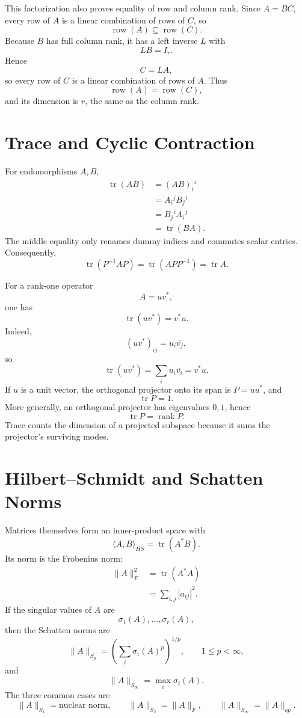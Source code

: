 This factorization also proves equality of row and column rank.  Since \(A=BC\), every row of \(A\) is a linear combination of rows of \(C\), so
\[
  \operatorname{row}(A)
  \subseteq\operatorname{row}(C).
\]
Because \(B\) has full column rank, it has a left inverse \(L\) with
\[
  LB=I_r.
\]
Hence
\[
  C=LA,
\]
so every row of \(C\) is a linear combination of rows of \(A\).  Thus
\[
  \operatorname{row}(A)
  =\operatorname{row}(C),
\]
and its dimension is \(r\), the same as the column rank.

\section{Trace and Cyclic Contraction}

For endomorphisms \(A,B\),
\[
\begin{aligned}
  \operatorname{tr}(AB)
  &=(AB)_i{}^i\\
  &=A_i{}^jB_j{}^i\\
  &=B_j{}^iA_i{}^j\\
  &=\operatorname{tr}(BA).
\end{aligned}
\]
The middle equality only renames dummy indices and commutes scalar entries.  Consequently,
\[
  \operatorname{tr}(P^{-1}AP)
  =\operatorname{tr}(APP^{-1})
  =\operatorname{tr}A.
\]

For a rank-one operator
\[
  A=uv^*,
\]
one has
\[
  \boxed{
  \operatorname{tr}(uv^*)=v^*u.}
\]
Indeed,
\[
  (uv^*)_{ij}=u_i\overline{v_j},
\]
so
\[
  \operatorname{tr}(uv^*)
  =\sum_i u_i\overline{v_i}
  =v^*u.
\]
If \(u\) is a unit vector, the orthogonal projector onto its span is \(P=uu^*\), and
\[
  \operatorname{tr}P=1.
\]
More generally, an orthogonal projector has eigenvalues \(0,1\), hence
\[
  \operatorname{tr}P=\operatorname{rank}P.
\]
Trace counts the dimension of a projected subspace because it sums the projector's surviving modes.

\section{Hilbert--Schmidt and Schatten Norms}

Matrices themselves form an inner-product space with
\[
  \langle A,B\rangle_{HS}
  =\operatorname{tr}(A^*B).
\]
Its norm is the Frobenius norm:
\[
\begin{aligned}
  \|A\|_F^2
  &=\operatorname{tr}(A^*A)\\
  &=\sum_{i,j}|a_{ij}|^2.
\end{aligned}
\]
If the singular values of \(A\) are
\[
  \sigma_1(A),\ldots,\sigma_r(A),
\]
then the Schatten norms are
\[
  \|A\|_{S_p}
  =
  \left(
  \sum_i\sigma_i(A)^p
  \right)^{1/p},
  \qquad1\le p<\infty,
\]
and
\[
  \|A\|_{S_\infty}=\max_i\sigma_i(A).
\]
The three common cases are
\[
  \|A\|_{S_1}=\text{nuclear norm},
  \qquad
  \|A\|_{S_2}=\|A\|_F,
  \qquad
  \|A\|_{S_\infty}=\|A\|_{op}.
\]

